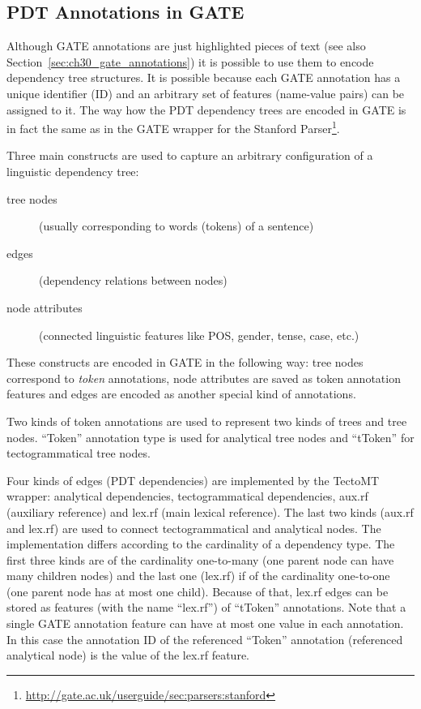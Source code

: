 \subsection{PDT Annotations in GATE} \label{sec:ch60_pdt_in_gate} \label{sec:LDR_in_GATE}

Although GATE annotations are just highlighted pieces of text (see also Section~\ref{sec:ch30_gate_annotations}) it is possible to use them to encode dependency tree structures. It is possible because each GATE annotation has a unique identifier (ID) and an arbitrary set of features (name-value pairs) can be assigned to it. The way how the PDT dependency trees are encoded in GATE is in fact the same as in the GATE wrapper for the Stanford Parser\footnote{\url{http://gate.ac.uk/userguide/sec:parsers:stanford}}. 

Three main constructs are used to capture an arbitrary configuration of a linguistic dependency tree:


\begin{description}
	\item[tree nodes] (usually corresponding to words (tokens) of a sentence)
	\item[edges] (dependency relations between nodes)
	\item[node attributes] (connected linguistic features like POS, gender, tense, case, etc.)
\end{description}

These constructs are encoded in GATE in the following way: tree nodes correspond to \emph{token} annotations, node attributes are saved as token annotation features and edges are encoded as another special kind of annotations.

Two kinds of token annotations are used to represent two kinds of trees and tree nodes. ``Token'' annotation type is used for analytical tree nodes and ``tToken'' for tectogrammatical tree nodes.

Four kinds of edges (PDT dependencies) are implemented by the TectoMT wrapper: analytical dependencies, tectogrammatical dependencies, aux.rf (auxiliary reference) and lex.rf (main lexical reference). The last two kinds (aux.rf and lex.rf) are used to connect tectogrammatical and analytical nodes. The implementation differs according to the cardinality of a dependency type. The first three kinds are of the cardinality one-to-many (one parent node can have many children nodes) and the last one (lex.rf) if of the cardinality one-to-one (one parent node has at most one child). Because of that, lex.rf edges can be stored as features (with the name ``lex.rf'') of ``tToken'' annotations. Note that a single GATE annotation feature can have at most one value in each annotation. In this case the annotation ID of the referenced ``Token'' annotation (referenced analytical node) is the value of the lex.rf feature.

